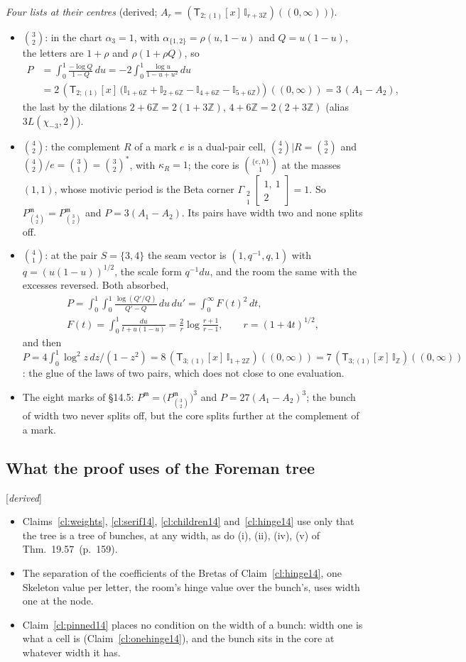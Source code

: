 \documentclass[11pt]{article}
\newcommand{\sT}{\mathsf T}
\newcommand{\Gst}[4]{\Gamma_{\substack{#1\\#2}}\!\begin{bmatrix}#3\\#4\end{bmatrix}}
\newcommand{\IZ}{\mathbb I_{\mathbb Z}}
\newcommand{\Ilat}[1]{\mathbb I_{#1}}
\newcommand{\Tx}[3]{(\sT_{#1;(1)}[x]\,#2)((#3,\infty))}
\newcommand{\status}[1]{\hfill{\small[\textit{#1}]}}
\newcommand{\hb}[2]{#1~(p.~#2)}   %
\theoremstyle{plain}
\theoremstyle{remark}
\begin{document}
\emph{Four lists at their centres} (derived; $A_r=\Tx{2}{\Ilat{r+3\mathbb Z}}{0}$).
\begin{itemize}
\item $\binom32$: in the chart $\alpha_3=1$, with $\alpha_{\{1,2\}}=\rho(u,1-u)$ and $Q=u(1-u)$, the letters are $1+\rho$ and $\rho(1+\rho Q)$, so
\begin{align*}
P&=\int_0^1\frac{-\log Q}{1-Q}\,du=-2\int_0^1\frac{\log u}{1-u+u^2}\,du\\
&=2\,\Tx{2}{\big(\Ilat{1+6\mathbb Z}+\Ilat{2+6\mathbb Z}-\Ilat{4+6\mathbb Z}-\Ilat{5+6\mathbb Z}\big)}{0}=3\,(A_1-A_2),
\end{align*}
the last by the dilations $2+6\mathbb Z=2(1+3\mathbb Z)$, $4+6\mathbb Z=2(2+3\mathbb Z)$ (alias $3L(\chi_{-3},2)$).
\item $\binom42$: the complement $R$ of a mark $e$ is a dual-pair cell, $\binom42|R=\binom32$ and $\binom42/e=\binom31=\binom32^\ast$, with $\kappa_R=1$; the core is $\binom{\{e,h\}}1$ at the masses $(1,1)$, whose motivic period is the Beta corner $\Gst21{1,\ 1}2=1$. So $P^{\mathfrak m}_{\binom42}=P^{\mathfrak m}_{\binom32}$ and $P=3(A_1-A_2)$. Its pairs have width two and none splits off.
\item $\binom41$: at the pair $S=\{3,4\}$ the seam vector is $(1,q^{-1},q,1)$ with $q=(u(1-u))^{1/2}$, the scale form $q^{-1}du$, and the room the same with the excesses reversed. Both absorbed,
\begin{gather*}
P=\int_0^1\!\!\int_0^1\frac{\log(Q'/Q)}{Q'-Q}\,du\,du'=\int_0^\infty F(t)^2\,dt,\\
F(t)=\int_0^1\frac{du}{t+u(1-u)}=\frac2r\log\frac{r+1}{r-1},\qquad r=(1+4t)^{1/2},
\end{gather*}
and then $P=4\int_0^1\log^2z\,dz/(1-z^2)=8\,\Tx3{\Ilat{1+2\mathbb Z}}0=7\,\Tx3{\IZ}0$: the glue of the laws of two pairs, which does not close to one evaluation.
\item The eight marks of \S14.5: $P^{\mathfrak m}=\big(P^{\mathfrak m}_{\binom32}\big)^3$ and $P=27(A_1-A_2)^3$; the bunch of width two never splits off, but the core splits further at the complement of a mark.
\end{itemize}

\subsection{What the proof uses of the Foreman tree}\status{derived}

\begin{itemize}
\item Claims~\ref{cl:weights}, \ref{cl:serif14}, \ref{cl:children14} and~\ref{cl:hinge14} use only that the tree is a tree of bunches, at any width, as do (i), (ii), (iv), (v) of Thm.~\hb{19.57}{159}.
\item The separation of the coefficients of the Bretas of Claim~\ref{cl:hinge14}, one Skeleton value per letter, the room's hinge value over the bunch's, uses width one at the node.
\item Claim~\ref{cl:pinned14} places no condition on the width of a bunch: width one is what a cell is (Claim~\ref{cl:onehinge14}), and the bunch sits in the core at whatever width it has.
\end{itemize}
\end{document}
